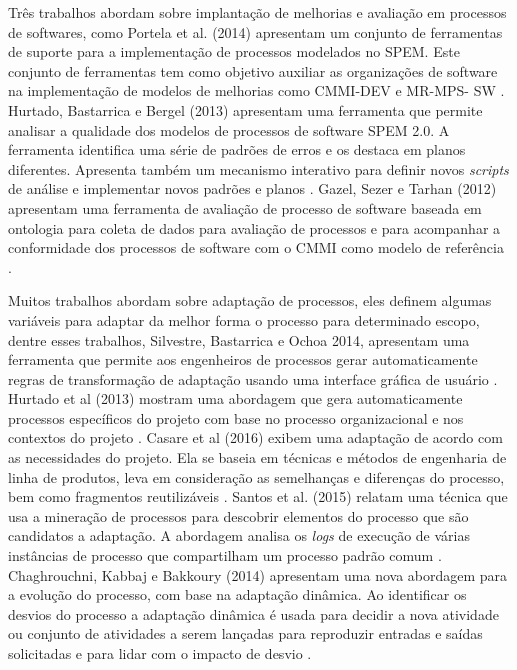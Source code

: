  
Três trabalhos abordam sobre implantação de melhorias e avaliação em processos de softwares, como Portela et al. (2014) apresentam um conjunto de ferramentas de suporte para a implementação de processos modelados no SPEM. Este conjunto de ferramentas tem como objetivo auxiliar as organizações de software na implementação  de modelos de melhorias como CMMI-DEV e MR-MPS- SW \cite{9portela:2014}. Hurtado, Bastarrica e Bergel (2013) apresentam uma ferramenta que permite analisar a qualidade dos modelos de processos de software SPEM 2.0. A ferramenta identifica uma série de padrões de erros e os destaca em planos diferentes. Apresenta também um mecanismo interativo para definir novos \textit{scripts} de análise e implementar novos padrões e planos \cite{6hurtado:2013}. 
Gazel, Sezer e Tarhan (2012) apresentam uma ferramenta de avaliação de processo de software baseada em ontologia para coleta de dados para avaliação de processos e para acompanhar a conformidade dos processos de software com o CMMI como modelo de referência \cite{7gazel:2012}. 


Muitos trabalhos abordam sobre adaptação de processos, eles definem algumas variáveis para adaptar da melhor forma o processo para determinado escopo, dentre esses trabalhos, Silvestre, Bastarrica e Ochoa 2014, apresentam uma ferramenta que permite aos engenheiros de processos gerar automaticamente regras de transformação de adaptação usando uma interface gráfica de usuário \cite{3silvestre:2014}. Hurtado et al (2013) mostram uma abordagem que gera automaticamente processos específicos do projeto com base no processo organizacional e nos contextos do projeto \cite{11hurtado:2013}. Casare et al (2016) exibem uma adaptação de acordo com as necessidades do projeto. Ela se baseia em técnicas e métodos de engenharia de linha de produtos, leva em consideração as semelhanças e diferenças do processo, bem como fragmentos reutilizáveis \cite{16casare:2016}. Santos et al. (2015) relatam uma técnica que usa a mineração de processos para descobrir elementos do processo que são candidatos a adaptação. A abordagem analisa os \textit{logs} de execução de várias instâncias de processo que compartilham um processo padrão comum \cite{17santos:2015}. Chaghrouchni, Kabbaj e Bakkoury (2014) apresentam uma nova abordagem para a evolução do processo, com base na adaptação dinâmica. Ao identificar os desvios do processo a adaptação dinâmica é usada para decidir a nova atividade ou conjunto de atividades a serem lançadas para reproduzir entradas e saídas solicitadas e para lidar com o impacto de desvio \cite{18chaghrouchni:2014}.

